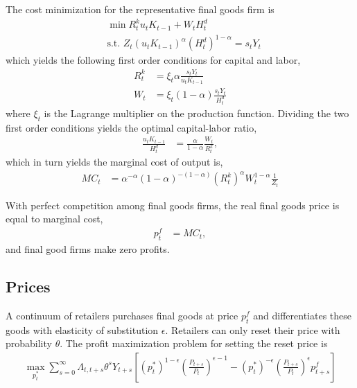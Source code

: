 \documentclass[11pt]{article}
\begin{document}
The cost minimization for the representative final goods firm is
\begin{align*}
	&\min R_{t}^k u_t K_{t-1} + W_t H_t^d \\
	&\text{s.t. } Z_t (u_t K_{t-1})^{\alpha} (H_t^d)^{1-\alpha} = s_t Y_t
\end{align*}
which yields the following first order conditions for capital and labor,
\begin{align*}
	R_{t}^k &= \xi_t \alpha \frac{s_t Y_t}{u_t K_{t-1}} \\
	W_t &= \xi_t (1-\alpha) \frac{s_t Y_t}{H_t^d}
\end{align*}
where $\xi_t$ is the Lagrange multiplier on the production function. Dividing the two first order conditions yields the optimal capital-labor ratio,
\begin{align*}
	\frac{u_t K_{t-1}}{H_t^d} &= \frac{\alpha}{1-\alpha}\frac{W_t}{R_{t}^k},
\end{align*}
% 
% 
which in turn yields the marginal cost of output is,
\begin{align*}
	MC_t &=\alpha^{-\alpha} (1-\alpha)^{-(1-\alpha)} (R_{t}^k)^{\alpha}W_t^{1-\alpha}\frac{1}{Z_t} 
\end{align*}

With perfect competition among final goods firms, the real final goods price is equal to marginal cost,
\begin{align*}
	p_t^f &=MC_t,
\end{align*}
and final good firms make zero profits.

\subsection{Prices}

A continuum of retailers purchases final goods at price $p_t^f$ and differentiates these goods with elasticity of substitution $\epsilon$. Retailers can only reset their price with probability $\theta$. The profit maximization problem for setting the reset price is
\begin{align*}
	\max_{p_t^*} \sum_{s=0}^{\infty} \Lambda_{t,t+s}\theta^{s}Y_{t+s}\left[(p_t^*)^{1-\epsilon} \left(\frac{P_{t+s}}{P_t}\right)^{\epsilon-1}  -  (p_t^*)^{-\epsilon}\left(\frac{P_{t+s}}{P_t}\right)^{\epsilon}p^f_{t+s}\right]
\end{align*}
\end{document}
